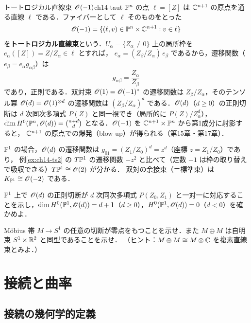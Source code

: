 \begin{myex}{トートロジカル直線束 $\mathscr{O}(-1)$}{ch14-taut}
$\mathbb{P}^n$ の点 $\ell=[Z]$ は $\mathbb{C}^{n+1}$ の原点を通る直線 $\ell$ である．ファイバーとして $\ell$ そのものをとった
\begin{equation}
  \mathscr{O}(-1) = \{(\ell,v)\in\mathbb{P}^n\times\mathbb{C}^{n+1} : v\in\ell\}
\end{equation}
を\textbf{トートロジカル直線束}という．$U_\alpha=\{Z_\alpha\neq0\}$ 上の局所枠を $e_\alpha([Z])=Z/Z_\alpha\in\ell$ とすれば，
$e_\alpha = (Z_\beta/Z_\alpha)\,e_\beta$ であるから，遷移関数（$e_\beta = e_\alpha g_{\alpha\beta}$）は
\begin{equation}
  g_{\alpha\beta} = \frac{Z_\alpha}{Z_\beta}
\end{equation}
であり，正則である．双対束 $\mathscr{O}(1)=\mathscr{O}(-1)^*$ の遷移関数は $Z_\beta/Z_\alpha$，そのテンソル冪 $\mathscr{O}(d)=\mathscr{O}(1)^{\otimes d}$ の遷移関数は
$(Z_\beta/Z_\alpha)^d$ である．$\mathscr{O}(d)$（$d\geq0$）の正則切断は $d$ 次同次多項式 $P(Z)$ と同一視でき（局所的に $P(Z)/Z_\alpha^d$），
$\dim H^0(\mathbb{P}^n,\mathscr{O}(d)) = \binom{n+d}{d}$ となる．$\mathscr{O}(-1)$ を $\mathbb{C}^{n+1}\times\mathbb{P}^n$ から第1成分に射影すると，
$\mathbb{C}^{n+1}$ の原点での爆発（blow-up）が得られる（第15章・第17章）．
\end{myex}

$\mathbb{P}^1$ の場合，$\mathscr{O}(d)$ の遷移関数は $g_{01}=(Z_1/Z_0)^{d}=z^d$（座標 $z=Z_1/Z_0$）であり，
例\ref{ex:ch14-ts2} の $T\mathbb{P}^1$ の遷移関数 $-z^{2}$ と比べて（定数 $-1$ は枠の取り替えで吸収できる）$T\mathbb{P}^1\cong\mathscr{O}(2)$ が分かる．
双対の余接束（＝標準束）は $K_{\mathbb{P}^1}\cong\mathscr{O}(-2)$ である．

$\mathbb{P}^1$ 上で $\mathscr{O}(d)$ の正則切断が $d$ 次同次多項式 $P(Z_0,Z_1)$ と一対一に対応することを示し，$\dim H^0(\mathbb{P}^1,\mathscr{O}(d))=d+1$（$d\geq0$），$H^0(\mathbb{P}^1,\mathscr{O}(d))=0$（$d<0$）を確かめよ．

Möbius 帯 $M\to S^1$ の任意の切断が零点をもつことを示せ．また $M\oplus M$ は自明束 $S^1\times\mathbb{R}^2$ と同型であることを示せ．
（ヒント：$M\oplus M\cong M\otimes\mathbb{C}$ を複素直線束とみよ．）

\section{接続と曲率}

\subsection{接続の幾何学的定義}

